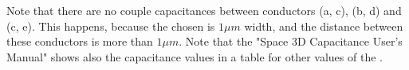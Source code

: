 \begin{figure}[h]
\centerline{}
\end{figure}

Note that there are no couple capacitances between conductors (a, c), (b, d) and (c, e).
This happens, because the chosen  is $1 \mu m$ width, and the distance between these
conductors is more than $1 \mu m$.
Note that the "Space 3D Capacitance User's Manual" shows also the capacitance values in a table
for other values of the .
